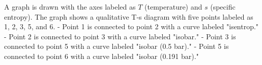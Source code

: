 A graph is drawn with the axes labeled as \( T \) (temperature) and \( s \) (specific entropy). The graph shows a qualitative T-s diagram with five points labeled as 1, 2, 3, 5, and 6.  
- Point 1 is connected to point 2 with a curve labeled "isentrop."  
- Point 2 is connected to point 3 with a curve labeled "isobar."  
- Point 3 is connected to point 5 with a curve labeled "isobar (0.5 bar)."  
- Point 5 is connected to point 6 with a curve labeled "isobar (0.191 bar)."
